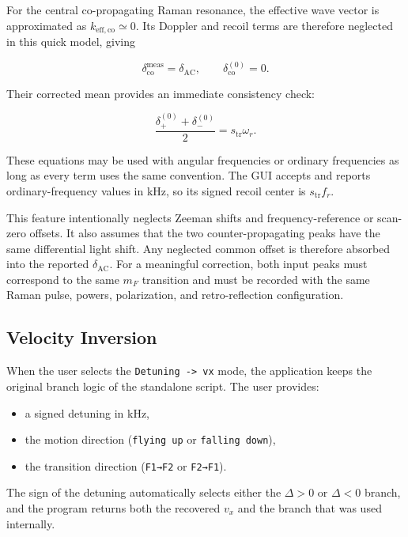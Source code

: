 \documentclass[11pt,a4paper]{article}
\begin{document}
For the central co-propagating Raman resonance, the effective wave vector is approximated as
$k_{\mathrm{eff,co}}\simeq 0$. Its Doppler and recoil terms are therefore neglected in this quick
model, giving

\begin{equation}
\delta_{\mathrm{co}}^{\mathrm{meas}}=\delta_{\mathrm{AC}},
\qquad
\delta_{\mathrm{co}}^{(0)}=0.
\end{equation}

Their corrected mean provides an immediate consistency check:

\begin{equation}
\frac{\delta_{+}^{(0)}+\delta_{-}^{(0)}}{2}=s_{\mathrm{tr}}\omega_r.
\end{equation}

These equations may be used with angular frequencies or ordinary frequencies as long as every
term uses the same convention. The GUI accepts and reports ordinary-frequency values in kHz, so
its signed recoil center is $s_{\mathrm{tr}}f_r$.

This feature intentionally neglects Zeeman shifts and frequency-reference or scan-zero offsets.
It also assumes that the two counter-propagating peaks have the same differential light shift.
Any neglected common offset is therefore absorbed into the reported $\delta_{\mathrm{AC}}$. For a
meaningful correction, both input peaks must correspond to the same $m_F$ transition and must be
recorded with the same Raman pulse, powers, polarization, and retro-reflection configuration.

\subsection{Velocity Inversion}

When the user selects the \texttt{Detuning -> vx} mode, the application keeps the original branch
logic of the standalone script. The user provides:

\begin{itemize}
  \item a signed detuning in kHz,
  \item the motion direction (\texttt{flying up} or \texttt{falling down}),
  \item the transition direction (\texttt{F1→F2} or \texttt{F2→F1}).
\end{itemize}

The sign of the detuning automatically selects either the $\Delta>0$ or $\Delta<0$ branch, and
the program returns both the recovered $v_x$ and the branch that was used internally.
\end{document}
